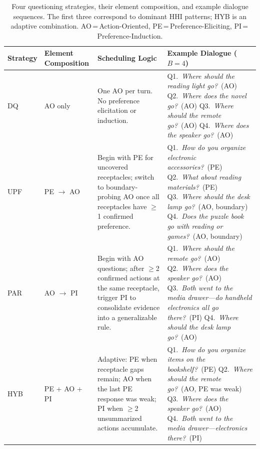 \documentclass[manuscript,review,anonymous]{acmart}
\begin{document}
\begin{table}[t]
\centering
\caption{Four questioning strategies, their element composition, and example dialogue sequences. The first three correspond to dominant HHI patterns; HYB is an adaptive combination. AO\,=\,Action-Oriented, PE\,=\,Preference-Eliciting, PI\,=\,Preference-Induction.}
\label{tab:strategies}
\renewcommand{\arraystretch}{1.35}
\small
\begin{tabularx}{\textwidth}{@{} l >{\centering\arraybackslash}p{1.9cm} >{\raggedright\arraybackslash}p{5cm} >{\raggedright\arraybackslash}X @{}}
\toprule
\textbf{Strategy} & \textbf{Element Composition} & \textbf{Scheduling Logic} & \textbf{Example Dialogue ($B=4$)} \\
\midrule
DQ & AO only &
One AO per turn. No preference elicitation or induction. &
Q1.~\textit{Where should the reading light go?}~(AO) \newline
Q2.~\textit{Where does the novel go?}~(AO) \newline
Q3.~\textit{Where should the remote go?}~(AO) \newline
Q4.~\textit{Where does the speaker go?}~(AO) \\
\midrule
UPF & PE $\to$ AO &
Begin with PE for uncovered receptacles; switch to boundary-probing AO once all receptacles have $\geq$1 confirmed preference. &
Q1.~\textit{How do you organize electronic accessories?}~(PE) \newline
Q2.~\textit{What about reading materials?}~(PE) \newline
Q3.~\textit{Where should the desk lamp go?}~(AO, boundary) \newline
Q4.~\textit{Does the puzzle book go with reading or games?}~(AO, boundary) \\
\midrule
PAR & AO $\to$ PI &
Begin with AO questions; after $\geq$2 confirmed actions at the same receptacle, trigger PI to consolidate evidence into a generalizable rule. &
Q1.~\textit{Where should the remote go?}~(AO) \newline
Q2.~\textit{Where does the speaker go?}~(AO) \newline
Q3.~\textit{Both went to the media drawer---do handheld electronics all go there?}~(PI) \newline
Q4.~\textit{Where should the desk lamp go?}~(AO) \\
\midrule
HYB & PE + AO + PI &
Adaptive: PE when receptacle gaps remain; AO when the last PE response was weak; PI when $\geq$2 unsummarized actions accumulate. &
Q1.~\textit{How do you organize items on the bookshelf?}~(PE) \newline
Q2.~\textit{Where should the remote go?}~(AO, PE was weak) \newline
Q3.~\textit{Where does the speaker go?}~(AO) \newline
Q4.~\textit{Both went to the media drawer---electronics there?}~(PI) \\
\bottomrule
\end{tabularx}
\renewcommand{\arraystretch}{1}
\end{table}
\end{document}
